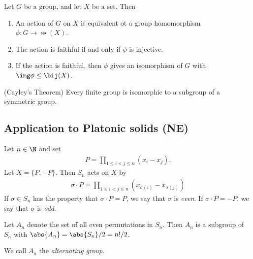 \documentclass{article}
\begin{document}
\begin{theorem}
    Let $G$ be a group, and let $X$ be a set. Then
    \begin{enumerate}
        \item An action of $G$ on $X$ is equivalent ot a group homomorphism $\phi:G\to\bij(X)$.
        \item The action is faithful if and only if $\phi$ is injective.
        \item If the action is faithful, then $\phi$ gives an isomorphism of $G$ with $\img\phi\leq\bij(X)$.
    \end{enumerate}
\end{theorem}

\begin{corollary}(Cayley's Theorem)
    Every finite group is isomorphic to a subgroup of a symmetric group.
\end{corollary}

\subsection{Application to Platonic solids (NE)}

\begin{definition}
    Let $n\in\N$ and set
    \begin{align*}
        P=\prod_{1\leq i<j\leq n}(x_i-x_j).
    \end{align*}
    Let $X=\{P,-P\}$. Then $S_n$ acts on $X$ by
    \begin{align*}
        \sigma\cdot P= \prod_{1\leq i < j \leq n} (x_{\sigma(i)}-x_{\sigma(j)})
    \end{align*}
    If $\sigma\in S_n$ has the property that $\sigma\cdot P=P$,
    we say that $\sigma$ is \emph{even}. If $\sigma\cdot P=-P$,
    we say that $\sigma$ is \emph{odd}.
\end{definition}

\setcounter{theorem}{3}
\begin{theorem}
    Let $A_n$ denote the set of all even permutations in $S_n$.
    Then $A_n$ is a subgroup of $S_n$ with $\abs{A_n}=
        \abs{S_n}/2 = n!/2$.
\end{theorem}

\begin{definition}
    We call $A_n$ the \emph{alternating group}.
\end{definition}
\end{document}
